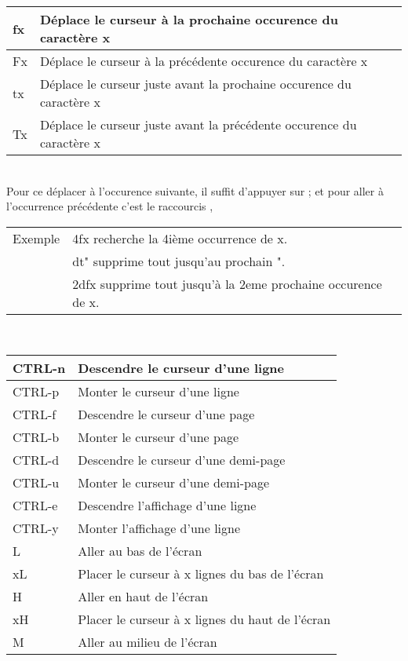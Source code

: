 \documentclass{article}
\begin{document}
\begin{tabular}{|p{3cm}| l|  }
	\hline
	fx & Déplace le curseur à la prochaine occurence du caractère x \\ \hline
	Fx & Déplace le curseur à la précédente occurence du caractère x \\ \hline
	tx & Déplace le curseur juste avant la prochaine occurence du caractère x \\ \hline
	Tx & Déplace le curseur juste avant la précédente occurence du caractère x \\ \hline
\end{tabular}\\

Pour ce déplacer à l'occurence suivante, il suffit d'appuyer sur ; et pour aller à l'occurrence  précédente c'est le raccourcis ,
    
\begin{tabular}{l l}
Exemple&	4fx  recherche la 4ième occurrence de x.\\
	&dt"  supprime tout jusqu'au prochain ".\\
	&2dfx  supprime tout jusqu'à la 2eme prochaine occurence de  x.\\
\end{tabular}\\

\begin{tabular}{|p{3cm}| l|  }
	\hline
	CTRL-n & Descendre le curseur d'une ligne \\ \hline
	CTRL-p & Monter le curseur d'une ligne\\ \hline
	CTRL-f & Descendre le curseur d'une page\\ \hline
	CTRL-b & Monter le curseur d'une page\\ \hline
	CTRL-d & Descendre le curseur d'une demi-page\\ \hline
	CTRL-u & Monter le curseur d'une demi-page\\ \hline
	CTRL-e & Descendre l'affichage d'une ligne\\ \hline
	CTRL-y & Monter l'affichage d'une ligne\\ \hline
	L & Aller au bas de l'écran\\ \hline
	xL  & Placer le curseur à x lignes du bas de l'écran \\ \hline
	H & Aller en haut de l'écran \\ \hline
	xH & Placer le curseur à x lignes du haut de l'écran \\ \hline
	M & Aller au milieu de l'écran\\ \hline
\end{tabular}\\
\end{document}
